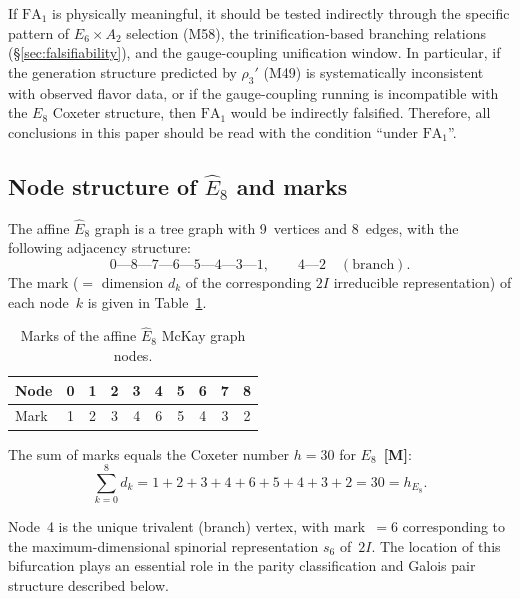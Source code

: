 \documentclass[sn-mathphys-num,Numbered]{sn-jnl}
\theoremstyle{thmstyleone}
\theoremstyle{thmstylethree}
\newcommand{\Ehat}{\hat{E}}
\newcommand{\layerM}{\textbf{[M]}}
\begin{document}
If $\mathrm{FA}_1$ is physically meaningful, it should be tested indirectly
through the specific pattern of $E_6 \times A_2$ selection (M58), the
trinification-based branching relations (\S\ref{sec:falsifiability}), and the
gauge-coupling unification window.
In particular, if the generation structure predicted by $\rho_3'$ (M49) is
systematically inconsistent with observed flavor data, or if the
gauge-coupling running is incompatible with the $E_8$ Coxeter structure, then
$\mathrm{FA}_1$ would be indirectly falsified.
Therefore, all conclusions in this paper should be read with the condition
``under $\mathrm{FA}_1$''.


\subsection{Node structure of $\Ehat_8$ and marks}\label{sec:marks}

The affine $\Ehat_8$ graph is a tree graph with 9~vertices and 8~edges, with
the following adjacency structure:
\begin{equation}\label{eq:E8graph}
  0 \text{---} 8 \text{---} 7 \text{---} 6 \text{---} 5 \text{---} 4
  \text{---} 3 \text{---} 1,
  \qquad
  4 \text{---} 2 \quad (\text{branch}).
\end{equation}
The mark ($= $ dimension $d_k$ of the corresponding $2I$ irreducible
representation) of each node~$k$ is given in Table~\ref{tab:marks}.

\begin{table}[htb]
\centering
\caption{Marks of the affine $\Ehat_8$ McKay graph nodes.}\label{tab:marks}
\begin{tabular}{l*{9}{c}}
\toprule
Node & 0 & 1 & 2 & 3 & 4 & 5 & 6 & 7 & 8 \\
\midrule
Mark & 1 & 2 & 3 & 4 & 6 & 5 & 4 & 3 & 2 \\
\bottomrule
\end{tabular}
\end{table}

The sum of marks equals the Coxeter number $h = 30$ for $E_8$~\layerM:
\begin{equation}\label{eq:mark-sum}
  \sum_{k=0}^{8} d_k = 1 + 2 + 3 + 4 + 6 + 5 + 4 + 3 + 2 = 30 = h_{E_8}.
\end{equation}

Node~4 is the unique trivalent (branch) vertex, with mark~$= 6$
corresponding to the maximum-dimensional spinorial representation $s_6$
of~$2I$.  The location of this bifurcation plays an essential role in the
parity classification and Galois pair structure described below.
\end{document}
